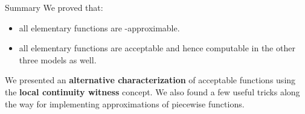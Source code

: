 \begin{frame}{Summary}
    We proved that:
    \pause
    \begin{itemize}
        \item all elementary functions are \WhileCC-approximable.
        \pause \item all elementary functions are acceptable
        \pause and hence computable in the other three models as well.
    \end{itemize}
     We presented an \textbf{alternative characterization} of acceptable functions \pause using the \textbf{local continuity witness} concept.
     We also found a few useful tricks along the way for implementing approximations of piecewise functions. 
\end{frame}
